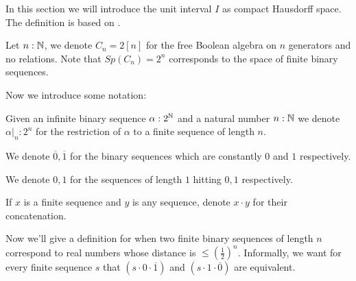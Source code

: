 In this section we will introduce the unit interval $I$ as compact Hausdorff space. 
The definition is based on \cite{Bishop}. 


%
\begin{example}
  Let $n:\mathbb{N}$, we denote $C_n = 2[n]$ for the free Boolean algebra on $n$ generators 
  and no relations. 
  Note that $Sp(C_n) = 2^n$ corresponds to the space of finite binary sequences. 
\end{example}
Now we introduce some notation:
\begin{definition}
  \item Given an infinite binary sequence $\alpha:2^{\mathbb{N}}$ and a natural number $n : \mathbb{N}$  
    we denote $\alpha|_n: 2^n$ for the 
    restriction of $\alpha$ to a finite sequence of length $n$. 
  \item We denote $\overline 0, \overline 1$ 
    for the binary sequences which are constantly $0$ and $1$ respectively. 
  \item We denote $0,1$ for the sequences of length $1$ hitting $0,1$ respectively. 
  \item If $x$ is a finite sequence and $y$ is any sequence, 
    denote $x\cdot y$ for their concatenation. 
\end{definition} 
Now we'll give a definition for when two finite binary sequences of length $n$ correspond 
to real numbers whose distance is $\leq (\frac12)^n$.
Informally, we want for every finite sequence $s$ that 
$(s \cdot 0 \cdot \overline 1)$ and  $(s \cdot 1 \cdot \overline 0)$ are equivalent. 

